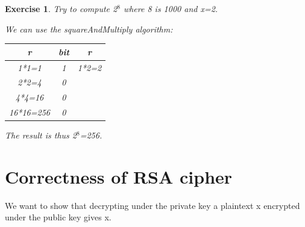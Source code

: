 \documentclass[a4paper, 12pt]{report}
\newtheorem{exercise}{\textbf{Exercise}}
\begin{document}
\begin{exercise}
	Try to compute 2$^8$ where 8 is 1000 and x=2.
	
	We can use the squareAndMultiply algorithm:
	\begin{table}[H]
		\centering
		\begin{tabular}{|c|c|c|}
			\hline
			\textbf{r} & \textbf{bit} & \textbf{r}\\ \hline
			1*1=1 & 1 & 1*2=2\\
			2*2=4 & 0 &\\
			4*4=16 & 0 &\\
			16*16=256 & 0 &\\ \hline
		\end{tabular}
	\end{table}
	The result is thus 2$^8$=256.
\end{exercise}

\section*{Correctness of RSA cipher}
We want to show that decrypting under the private key a plaintext x encrypted under the public key gives x.
\end{document}
